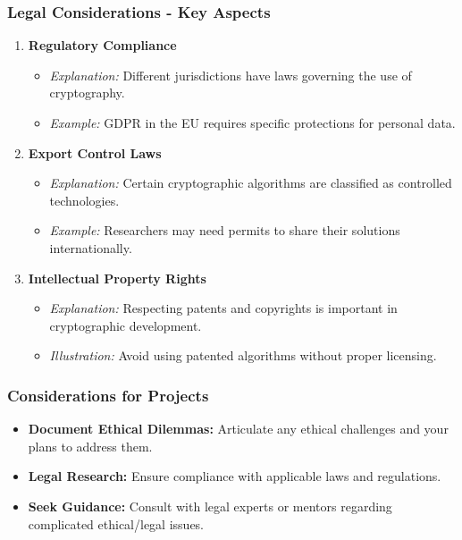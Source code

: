 \documentclass{beamer}
\begin{document}
\begin{frame}[fragile]
    \frametitle{Legal Considerations - Key Aspects}
    \begin{enumerate}
        \item \textbf{Regulatory Compliance}
            \begin{itemize}
                \item \textit{Explanation:} Different jurisdictions have laws governing the use of cryptography.
                \item \textit{Example:} GDPR in the EU requires specific protections for personal data.
            \end{itemize}

        \item \textbf{Export Control Laws}
            \begin{itemize}
                \item \textit{Explanation:} Certain cryptographic algorithms are classified as controlled technologies.
                \item \textit{Example:} Researchers may need permits to share their solutions internationally.
            \end{itemize}

        \item \textbf{Intellectual Property Rights}
            \begin{itemize}
                \item \textit{Explanation:} Respecting patents and copyrights is important in cryptographic development.
                \item \textit{Illustration:} Avoid using patented algorithms without proper licensing.
            \end{itemize}
    \end{enumerate}
\end{frame}

\begin{frame}[fragile]
    \frametitle{Considerations for Projects}
    \begin{itemize}
        \item \textbf{Document Ethical Dilemmas:} Articulate any ethical challenges and your plans to address them.
        \item \textbf{Legal Research:} Ensure compliance with applicable laws and regulations.
        \item \textbf{Seek Guidance:} Consult with legal experts or mentors regarding complicated ethical/legal issues.
    \end{itemize}
\end{frame}
\end{document}

